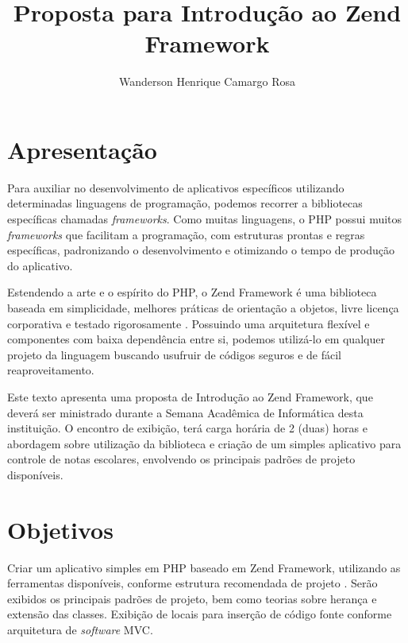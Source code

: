 \documentclass{article}
\title{Proposta para Introdução ao Zend Framework}
\author{Wanderson Henrique Camargo Rosa}
\begin{document}
\maketitle{}

\section{Apresentação}
\label{sec:apresentacao}

Para auxiliar no desenvolvimento de aplicativos específicos utilizando
determinadas linguagens de programação, podemos recorrer a bibliotecas
específicas chamadas \emph{frameworks}. Como muitas linguagens, o PHP possui
muitos \emph{frameworks} que facilitam a programação, com estruturas prontas e
regras específicas, padronizando o desenvolvimento e otimizando o tempo de
produção do aplicativo.

Estendendo a arte e o espírito do PHP, o Zend Framework é uma biblioteca
baseada em simplicidade, melhores práticas de orientação a objetos, livre
licença corporativa e testado rigorosamente \cite{zend}. Possuindo uma
arquitetura flexível e componentes com baixa dependência entre si, podemos
utilizá-lo em qualquer projeto da linguagem buscando usufruir de códigos seguros
e de fácil reaproveitamento.

Este texto apresenta uma proposta de Introdução ao Zend Framework, que deverá
ser ministrado durante a Semana Acadêmica de Informática desta instituição. O
encontro de exibição, terá carga horária de 2 (duas) horas e abordagem sobre
utilização da biblioteca e criação de um simples aplicativo para controle de
notas escolares, envolvendo os principais padrões de projeto disponíveis.

\section{Objetivos}
\label{sec:objetivos}

Criar um aplicativo simples em PHP baseado em Zend Framework, utilizando as
ferramentas disponíveis, conforme estrutura recomendada de projeto \cite{zend}.
Serão exibidos os principais padrões de projeto, bem como teorias sobre herança
e extensão das classes. Exibição de locais para inserção de código fonte
conforme arquitetura de \emph{software} MVC.
\end{document}
